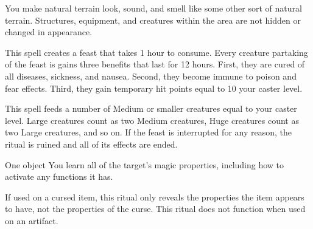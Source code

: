 \spelleffect You make natural terrain look, sound, and smell like some other sort of natural terrain. Structures, equipment, and creatures within the area are not hidden or changed in appearance.

\spelleffect This spell creates a feast that takes 1 hour to consume. Every creature partaking of the feast is gains three benefits that last for 12 hours. First, they are cured of all diseases, sickness, and nausea. Second, they become immune to poison and fear effects. Third, they gain temporary hit points equal to 10 \add your caster level.

This spell feeds a number of Medium or smaller creatures equal to your caster level. Large creatures count as two Medium creatures, Huge creatures count as two Large creatures, and so on.
\spellnotes If the feast is interrupted for any reason, the ritual is ruined and all of its effects are ended.

\begin{spelltarget}{One object}
    \spelleffect You learn all of the target's magic properties, including how to activate any functions it has.
\end{spelltarget}
\spellnotes If used on a cursed item, this ritual only reveals the properties the item appears to have, not the properties of the curse. This ritual does not function when used on an artifact.

